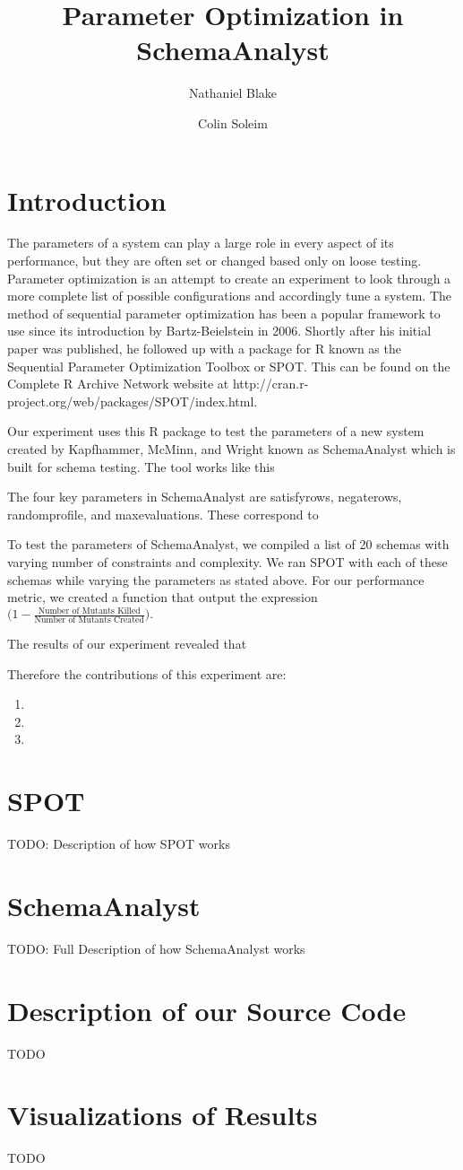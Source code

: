 \documentclass[a4paper]{article}
\title{Parameter Optimization in SchemaAnalyst}
\author{Nathaniel Blake \and Colin Soleim }
\begin{document}
\maketitle

\section{Introduction}

The parameters of a system can play a large role in every aspect of its performance, but they are often set or changed based only on loose testing. Parameter optimization is an attempt to create an experiment to look through a more complete list of possible configurations and accordingly tune a system. The method of sequential parameter optimization has been a popular framework to use since its introduction by Bartz-Beielstein in 2006. Shortly after his initial paper was published, he followed up with a package for R known as the Sequential Parameter Optimization Toolbox or SPOT. This can be found on the Complete R Archive Network website at http://cran.r-project.org/web/packages/SPOT/index.html. 

Our experiment uses this R package to test the parameters of a new system created by Kapfhammer, McMinn, and Wright known as SchemaAnalyst which is built for schema testing. The tool works like this

The four key parameters in SchemaAnalyst are satisfyrows, negaterows, randomprofile, and maxevaluations. These correspond to 

To test the parameters of SchemaAnalyst, we compiled a list of 20 schemas with varying number of constraints and complexity. We ran SPOT with each of these schemas while varying the parameters as stated above. For our performance metric, we created a function that output the expression $ \big( 1 - \frac{\text{Number of Mutants Killed}}{\text{Number of Mutants Created}} \big). $

The results of our experiment revealed that 

Therefore the contributions of this experiment are:

\begin{enumerate}
\item
\item
\item
\end{enumerate}

\section{SPOT}

TODO: Description of how SPOT works

\section{SchemaAnalyst}

TODO: Full Description of how SchemaAnalyst works

\section{Description of our Source Code}

TODO

\section{Visualizations of Results}

TODO
\end{document}
